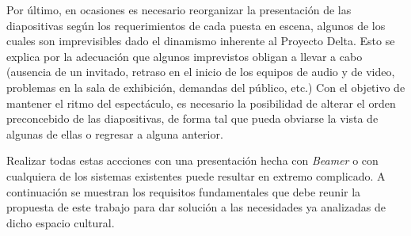 			Por último, en ocasiones es necesario reorganizar la presentación de las diapositivas según los requerimientos de cada puesta en escena, algunos de los cuales son imprevisibles dado el dinamismo inherente al Proyecto Delta. Esto se explica por la adecuación que algunos imprevistos obligan a llevar a cabo (ausencia de un invitado, retraso en el inicio de los equipos de audio y de video, problemas en la sala de exhibición, demandas del público, etc.) Con el objetivo de mantener el ritmo del espectáculo, es necesario la posibilidad de alterar el orden preconcebido de las diapositivas, de forma tal que pueda obviarse la vista de algunas de ellas o regresar a alguna anterior.			

			Realizar todas estas accciones con una presentación hecha con \textit{Beamer} o con cualquiera de los sistemas existentes puede resultar en extremo complicado. A continuación se muestran los requisitos fundamentales que debe reunir la propuesta de este trabajo para dar solución a las necesidades ya analizadas de dicho espacio cultural. 

